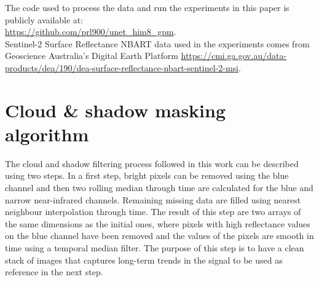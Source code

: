 \documentclass[essd, manuscript]{copernicus}
\begin{document}





\codedataavailability{} 
The code used to process the data and run the experiments in this paper is publicly available at: \\
\href{https://github.com/prl900/unet_him8_gpm}{https://github.com/prl900/unet\_him8\_gpm}. \\
Sentinel-2 Surface Reflectance NBART data used in the experiments comes from Geoscience Australia's Digital Earth Platform \href{https://cmi.ga.gov.au/data-products/dea/190/dea-surface-reflectance-nbart-sentinel-2-msi}{https://cmi.ga.gov.au/data-products/dea/190/dea-surface-reflectance-nbart-sentinel-2-msi}. 



\appendix
\section{Cloud \& shadow masking algorithm} %

The cloud and shadow filtering process followed in this work can be described using two steps. In a first step, bright pixels can be removed using the blue channel and then two rolling median through time are calculated for the blue and narrow near-infrared channels. Remaining missing data are filled using nearest neighbour interpolation through time. The result of this step are two arrays of the same dimensions as the initial ones, where pixels with high reflectance values on the blue channel have been removed and the values of the pixels are smooth in time using a temporal median filter. The purpose of this step is to have a clean stack of images that captures long-term trends in the signal to be used as reference in the next step.
\end{document}
